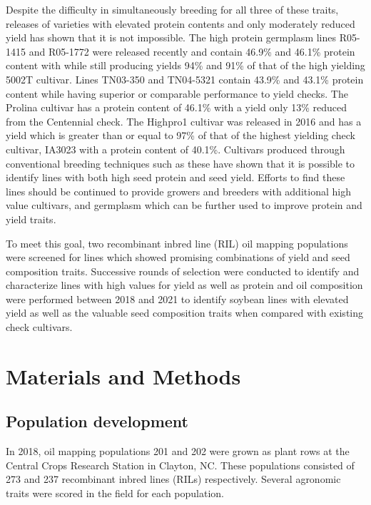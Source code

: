 \documentclass[Agronomy,article,submit,moreauthors,pdftex]{mdpi}
\begin{document}
Despite the difficulty in simultaneously breeding for all three of these
traits, releases of varieties with elevated protein contents and only
moderately reduced yield has shown that it is not impossible. The high
protein germplasm lines R05-1415 and R05-1772 were released recently and
contain 46.9\% and 46.1\% protein content with while still producing
yields 94\% and 91\% of that of the high yielding 5002T
cultivar\citep{HiProtHiYield02}. Lines TN03-350 and TN04-5321 contain
43.9\% and 43.1\% protein content while having superior or comparable
performance to yield checks\citep{HiProtHiYield04}. The Prolina cultivar
has a protein content of 46.1\% with a yield only 13\% reduced from the
Centennial check\citep{HiProtHiYield01}. The Highpro1 cultivar was
released in 2016 and has a yield which is greater than or equal to 97\%
of that of the highest yielding check cultivar, IA3023 with a protein
content of 40.1\%\citep{HighPro1}. Cultivars produced through
conventional breeding techniques such as these have shown that it is
possible to identify lines with both high seed protein and seed yield.
Efforts to find these lines should be continued to provide growers and
breeders with additional high value cultivars, and germplasm which can
be further used to improve protein and yield traits.

To meet this goal, two recombinant inbred line (RIL) oil mapping
populations were screened for lines which showed promising combinations
of yield and seed composition traits. Successive rounds of selection
were conducted to identify and characterize lines with high values for
yield as well as protein and oil composition were performed between 2018
and 2021 to identify soybean lines with elevated yield as well as the
valuable seed composition traits when compared with existing check
cultivars.

\hypertarget{materials-and-methods}{%
\section{Materials and Methods}\label{materials-and-methods}}

\hypertarget{population-development}{%
\subsection{Population development}\label{population-development}}

In 2018, oil mapping populations 201 and 202 were grown as plant rows at
the Central Crops Research Station in Clayton, NC. These populations
consisted of 273 and 237 recombinant inbred lines (RILs) respectively.
Several agronomic traits were scored in the field for each population.
\end{document}

